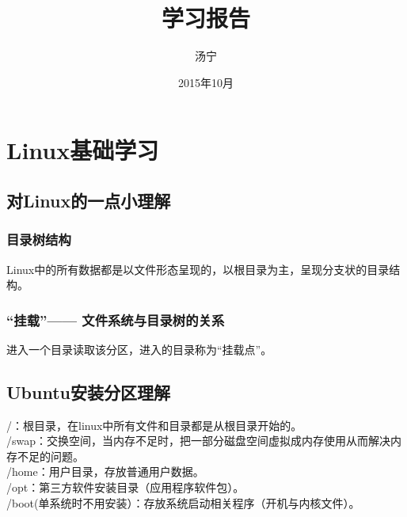 \documentclass[12pt]{article}
\begin{document}
\title{\vspace{-2em}学习报告\vspace{-0.7em}}
\author{汤宁}
\date{\vspace{-0.7em}2015年10月\vspace{-0.7em}}
\maketitle\thispagestyle{fancy}
\maketitle
\tableofcontents 

\section{Linux基础学习}
\subsection{对Linux的一点小理解}

\subsubsection{目录树结构}
\begin{flushleft}
Linux中的所有数据都是以文件形态呈现的，以根目录为主，呈现分支状的目录结构。
\end{flushleft}
\subsubsection{“挂载”——{} 文件系统与目录树的关系}
\begin{flushleft}
进入一个目录读取该分区，进入的目录称为“挂载点”。
\end{flushleft}
\subsection{Ubuntu安装分区理解}
\begin{flushleft}
\slash{}：根目录，在linux中所有文件和目录都是从根目录开始的。\\
\slash{}swap：交换空间，当内存不足时，把一部分磁盘空间虚拟成内存使用从而解决内存不足的问题。\\
\slash{}home：用户目录，存放普通用户数据。\\
\slash{}opt：第三方软件安装目录（应用程序软件包）。\\
\slash{}boot(单系统时不用安装）：存放系统启动相关程序（开机与内核文件）。
\end{flushleft}
\end{document}
